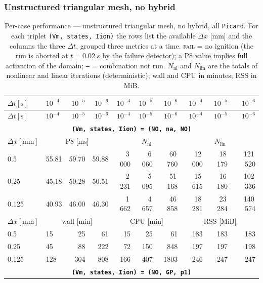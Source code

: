 \documentclass[11pt,a4paper]{article}
\newcommand{\code}[1]{\texttt{\small #1}}
\begin{document}
\subsubsection{Unstructured triangular mesh, no hybrid}
\label{sec:res2d:triF}
\begin{center}\footnotesize
\begin{longtable}{l|lrr|rrr|rrr}
\caption{Per-case performance --- unstructured triangular mesh, no hybrid, all \code{Picard}. For each triplet \code{(Vm, states, Iion)} the rows list the available $\Delta x$ [mm] and the columns the three $\Delta t$, grouped three metrics at a time. \textsc{fail} = no ignition (the run is aborted at $t=\SI{0.02}{s}$ by the failure detector); a P8 value implies full activation of the domain; \texttt{--} = combination not run. $N_{\mathrm{nl}}$ and $N_{\mathrm{lin}}$ are the totals of nonlinear and linear iterations (deterministic); wall and CPU in minutes; RSS in MiB.}\label{tab:res2d:triF}\\
\toprule $ \Delta t [\text{s}]$ & $10^{-4}$ & $10^{-5}$ & $10^{-6}$ & $10^{-4}$ & $10^{-5}$ & $10^{-6}$ & $10^{-4}$ & $10^{-5}$ & $10^{-6}$\\ \midrule\endfirsthead
\toprule $ \Delta t [\text{s}]$ & $10^{-4}$ & $10^{-5}$ & $10^{-6}$ & $10^{-4}$ & $10^{-5}$ & $10^{-6}$ & $10^{-4}$ & $10^{-5}$ & $10^{-6}$\\ \midrule\endhead
\multicolumn{10}{c}{\textbf{\code{(Vm, states, Iion) = (NO, na, NO)}}}\\\hline
$ \Delta x [\text{mm}] $ & \multicolumn{3}{c|}{P8 [ms]} & \multicolumn{3}{c|}{$N_{\mathrm{nl}}$} & \multicolumn{3}{c|}{$N_{\mathrm{lin}}$}\\
0.5 & 55.81 & 59.70 & 59.88 & 3\,000 & 6\,060 & 60\,760 & 12\,000 & 18\,179 & 121\,520\\
0.25 & 45.18 & 50.28 & 50.51 & 2\,231 & 5\,095 & 51\,168 & 15\,615 & 16\,180 & 102\,336\\
0.125 & 40.93 & 46.00 & 46.30 & 1\,662 & 4\,657 & 46\,858 & 18\,281 & 23\,284 & 140\,574\\
\hline
$ \Delta x [\text{mm}] $ & \multicolumn{3}{c|}{wall [min]} & \multicolumn{3}{c|}{CPU [min]} & \multicolumn{3}{c|}{RSS [MiB]}\\
0.5 & 15 & 25 & 61 & 15 & 25 & 61 & 183 & 183 & 183\\
0.25 & 45 & 88 & 222 & 72 & 150 & 848 & 197 & 197 & 198\\
0.125 & 128 & 304 & 808 & 166 & 407 & 1803 & 246 & 247 & 247\\
\hline
\hline
\multicolumn{10}{c}{\textbf{\code{(Vm, states, Iion) = (NO, GP, p1)}}}\\\hline

\end{longtable}
\end{center}
\end{document}

